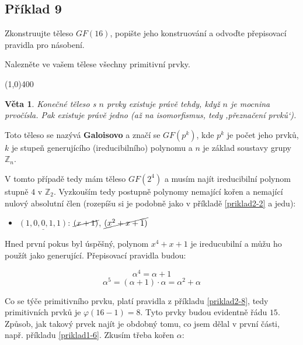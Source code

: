 \documentclass{article}
\newtheorem{veta}{Věta}[section]
\begin{document}
\subsection{Příklad 9}
Zkonstruujte těleso $GF(16)$, popište jeho konstruování a odvoďte přepisovací pravidla pro násobení.

Nalezněte ve vašem tělese všechny primitivní prvky.

\line(1,0){400}

\begin{veta}
Konečné těleso s $n$ prvky existuje právě tehdy, když $n$ je mocnina prvočísla. Pak existuje právě jedno (až na isomorfismus, tedy ‚přeznačení prvků‘).
\end{veta}

Toto těleso se nazývá \textbf{Galoisovo} a značí se $GF(p^k)$, kde $p^k$ je počet jeho prvků, $k$ je stupeň generujícího (ireducibilního) polynomu a $n$ je základ soustavy grupy $\mathbb{Z}_n$. 

V tomto případě tedy mám těleso $GF(2^4)$ a musím najít ireducibilní polynom stupně $4$ v $\mathbb{Z}_2$. Vyzkouším tedy postupně polynomy nemající kořen a nemající nulový absolutní člen (rozepíšu si je podobně jako v příkladě \ref{priklad2-2} a jedu):

\begin{itemize}
	\item $\underline{(1,0,0,1,1)}$: $\cancel{(x+1)}$, $\cancel{(x^2 + x + 1)}$ 
\end{itemize}

Hned první pokus byl úspěšný, polynom $x^4 + x + 1$ je ireducubilní a můžu ho použít jako generující. Přepisovací pravidla budou:

\[ \alpha^4 = \alpha + 1 \]	
\[ \alpha^5 = (\alpha + 1)\cdot \alpha = \alpha^2 + \alpha\]

Co se týče primitivního prvku, platí pravidla z příkladu \ref{priklad2-8}, tedy primitivních prvků je $\varphi(16 - 1) = 8$. Tyto prvky budou evidentně řádu $15$. Způsob, jak takový prvek najít je obdobný tomu, co jsem dělal v první části, např. příkladu \ref{priklad1-6}. Zkusím třeba kořen $\alpha$:
\end{document}
